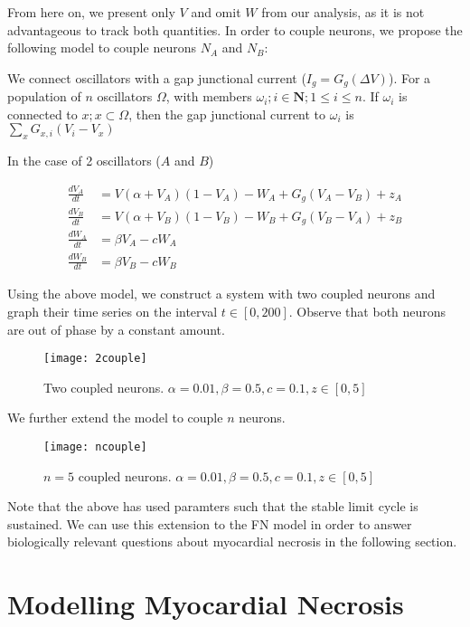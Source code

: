 \documentclass[11pt]{report}
\begin{document}
From here on, we present only $V$ and omit $W$ from our analysis, as it is not advantageous to track both quantities. In order to couple neurons, we propose the following model to couple neurons $N_A$ and $N_B$:


We connect oscillators with a gap junctional current ($I_g = G_g(\Delta V)$). For a population of $n$ oscillators $\Omega$, with members $\omega_i; i\in \textbf{N}; 1\leq i\leq n$. If $\omega_i$ is connected to $x; x\subset\Omega$, then the gap junctional current to $\omega_i$ is $\sum_{x} G_{x,i}(V_i-V_x)$

In the case of 2 oscillators ($A$ and $B$)

$$ \begin{aligned} \frac{dV_A}{dt} &= V(\alpha +V_A)(1-V_A) -W_A + G_g(V_A-V_B) + z_A\\ \frac{dV_B}{dt} &= V(\alpha +V_B)(1-V_B) -W_B + G_g(V_B-V_A) +z_B\\ \frac{dW_A}{dt} &= \beta V_A - cW_A\\ \frac{dW_B}{dt} &= \beta V_B - cW_B
\end{aligned} $$

Using the above model, we construct a system with two coupled neurons and graph their time series on the interval $t \in [0,200]$. Observe that both neurons are out of phase by a constant amount.


\begin{figure}[!ht]
  \caption{Two coupled neurons. $\alpha = 0.01, \beta = 0.5,c = 0.1,z \in [0,5]$ }
  \centering
    \texttt{[image: 2couple]}
\end{figure}

We further extend the model to couple $n$ neurons. 

\begin{figure}[!ht]
  \caption{$n=5$ coupled neurons. $\alpha = 0.01, \beta = 0.5,c = 0.1,z \in [0,5]$ }
  \centering
    \texttt{[image: ncouple]}
\end{figure}

Note that the above has used paramters such that the stable limit cycle is sustained. We can use this extension to the FN model in order to answer biologically relevant questions about myocardial necrosis in the following section. 


\chapter{Modelling Myocardial Necrosis} 
\end{document}
